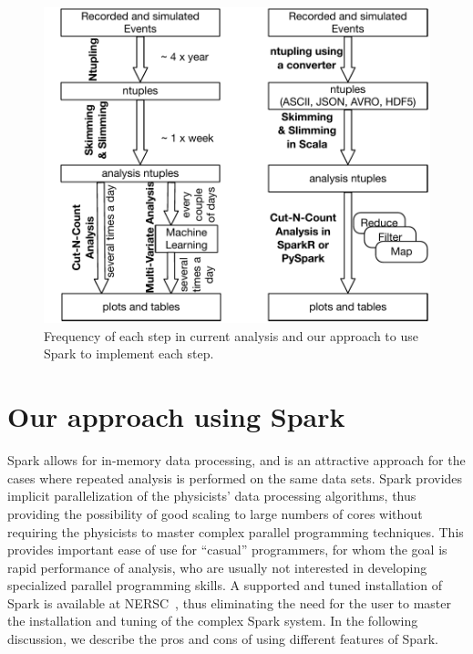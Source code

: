 \documentclass[11pt, twocolumn]{article}
\newcommand{\squeezeup}{\vspace{-5.5mm}}
\begin{document}
\squeezeup
\begin{figure}[htbp]
\begin{center}
 \includegraphics[scale=0.5]{flow}
\caption{Frequency of each step in current analysis and our approach to 
use Spark to implement each step. }
\label{fig:flow}
\end{center}
\end{figure}
\squeezeup

%

\section{Our approach using Spark}
\squeezeup
Spark allows for in-memory data processing, and is an attractive
approach for the cases where repeated analysis is performed on the
same data sets. Spark provides implicit parallelization of the
physicists' data processing algorithms, thus providing the possibility
of good scaling to large numbers of cores without requiring the
physicists to master complex parallel programming techniques. This
provides important ease of use for ``casual'' programmers, for whom
the goal is rapid performance of analysis, who are usually not
interested in developing specialized parallel programming
skills.  A supported and tuned installation of Spark is
available at NERSC~\cite{nersc-spark}, thus eliminating the need for 
the user to master the installation and tuning of the complex Spark system.
In the following discussion, we describe the pros and cons of using 
different features of Spark. 
\end{document}
